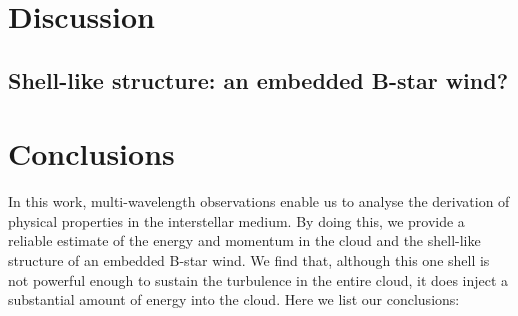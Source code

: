 \documentclass[11pt,a4paper]{emulateapj}
\begin{document}
\section{Discussion}
\label{sec:discussion}


\subsection{Shell-like structure: an embedded B-star wind?}


\section{Conclusions}
In this work, multi-wavelength observations enable us to analyse the derivation of physical properties in the interstellar medium. By doing this, we provide a reliable estimate of the energy and momentum in the cloud and the shell-like structure of an embedded B-star wind. We find that, although this one shell is not powerful enough to sustain the turbulence in the entire cloud, it does inject a substantial amount of energy into the cloud. Here we list our conclusions:
\end{document}
